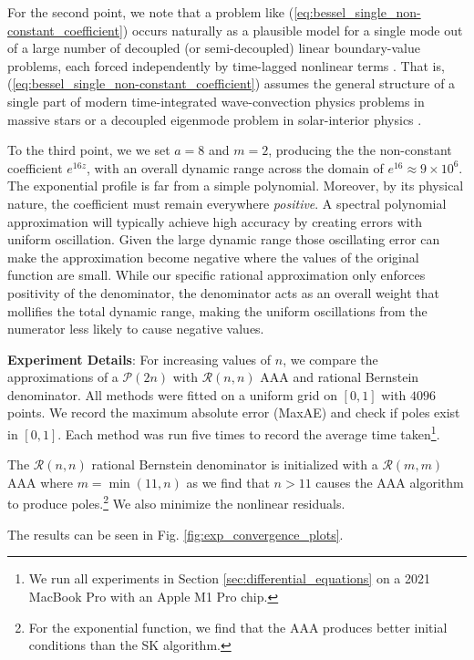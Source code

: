 \documentclass{article}
\begin{document}
{For the second point, we note that a problem like (\ref{eq:bessel_single_non-constant_coefficient}) occurs naturally as a plausible model for a single mode out of a large number of decoupled (or semi-decoupled) linear boundary-value problems, each forced independently by time-lagged nonlinear terms \cite{dedalus}. That is, (\ref{eq:bessel_single_non-constant_coefficient}) assumes the general structure of a single part of modern time-integrated wave-convection physics problems in massive stars \cite{Anders2023} or a decoupled eigenmode problem in solar-interior physics \cite{Vasil2024}.}

{To the third point, we we set $a=8$ and $m=2$, producing the the non-constant coefficient $e^{16 z}$, with an overall dynamic range across the domain of $e^{16} \approx 9\times 10^{6}$. The exponential profile is far from a simple polynomial. Moreover, by its physical nature, the coefficient must remain everywhere \textit{positive}. A spectral polynomial approximation will typically achieve high accuracy by creating errors with uniform oscillation. Given the large dynamic range those oscillating error can make the approximation become negative where the values of the original function are small. While our specific rational approximation only enforces positivity of the denominator, the denominator acts as an overall weight that mollifies the total dynamic range, making the uniform oscillations from the numerator less likely to cause negative values.}

{\textbf{Experiment Details}: For increasing values of $n$, we compare the approximations of a $\mathcal{P}(2n)$ with $\mathcal{R}(n,n)$ AAA and rational Bernstein denominator. All methods were fitted on a uniform grid on $[0, 1]$ with $4096$ points. We record the maximum absolute error (MaxAE) and check if poles exist in $[0, 1]$. Each method was run five times to record the average time taken\footnote{We run all experiments in Section \ref{sec:differential_equations} on a 2021 MacBook Pro with an Apple M1 Pro chip.}.}

{The $\mathcal{R}(n,n)$ rational Bernstein denominator is initialized with a $\mathcal{R}(m, m)$ AAA where $m=\min(11,n)$ as we find that $n>11$ causes the AAA algorithm to produce poles.\footnote{For the exponential function, we find that the AAA produces better initial conditions than the SK algorithm.} We also minimize the nonlinear residuals.}

{The results can be seen in Fig. \ref{fig:exp_convergence_plots}.}
\end{document}
